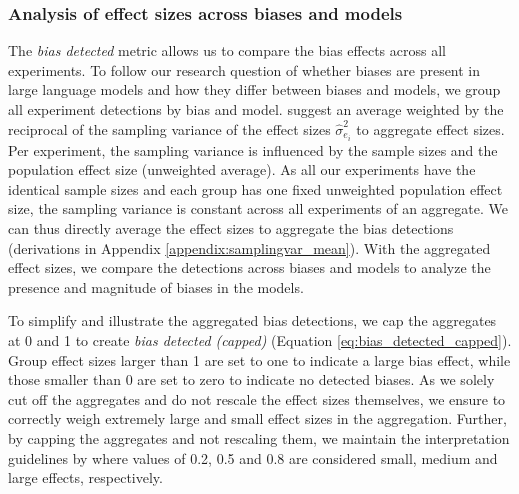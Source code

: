 \subsubsection{Analysis of effect sizes across biases and models}
\label{methodologies:analysisbiasmodels}
\par The \textit{bias detected} metric allows us to compare the bias effects across all experiments. To follow our research question of whether biases are present in large language models and how they differ between biases and models, we group all experiment detections by bias and model. \textcite{morris2002combining} suggest an average weighted by the reciprocal of the sampling variance of the effect sizes $\hat{\sigma}^2_{e_{i}}$ to aggregate effect sizes. Per experiment, the sampling variance is influenced by the sample sizes and the population effect size (unweighted average). As all our experiments have the identical sample sizes and each group has one fixed unweighted population effect size, the sampling variance is constant across all experiments of an aggregate. We can thus directly average the effect sizes to aggregate the bias detections (derivations in Appendix \ref{appendix:samplingvar_mean}). With the aggregated effect sizes, we compare the detections across biases and models to analyze the presence and magnitude of biases in the models.

\par To simplify and illustrate the aggregated bias detections, we cap the aggregates at 0 and 1 to create \textit{bias detected (capped)} (Equation \ref{eq:bias_detected_capped}). Group effect sizes larger than 1 are set to one to indicate a large bias effect, while those smaller than 0 are set to zero to indicate no detected biases. As we solely cut off the aggregates and do not rescale the effect sizes themselves, we ensure to correctly weigh extremely large and small effect sizes in the aggregation. Further, by capping the aggregates and not rescaling them, we maintain the interpretation guidelines by \textcite{cohen1988statistical} where values of 0.2, 0.5 and 0.8 are considered small, medium and large effects, respectively.


